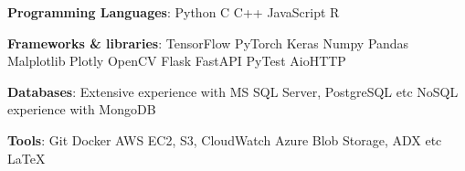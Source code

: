 \textbf{Programming Languages}: Python {\scalerel*{\cdot}{\bigodot}} C {\scalerel*{\cdot}{\bigodot}} C++ {\scalerel*{\cdot}{\bigodot}} JavaScript {\scalerel*{\cdot}{\bigodot}} R

\textbf{Frameworks \& libraries}: TensorFlow {\scalerel*{\cdot}{\bigodot}} PyTorch {\scalerel*{\cdot}{\bigodot}} Keras {\scalerel*{\cdot}{\bigodot}} Numpy {\scalerel*{\cdot}{\bigodot}} Pandas {\scalerel*{\cdot}{\bigodot}} Malplotlib {\scalerel*{\cdot}{\bigodot}} Plotly {\scalerel*{\cdot}{\bigodot}}
OpenCV {\scalerel*{\cdot}{\bigodot}} Flask {\scalerel*{\cdot}{\bigodot}} FastAPI {\scalerel*{\cdot}{\bigodot}} PyTest {\scalerel*{\cdot}{\bigodot}} AioHTTP


\textbf{Databases}: Extensive experience with MS SQL Server, PostgreSQL etc {\scalerel*{\cdot}{\bigodot}} NoSQL experience with MongoDB

\textbf{Tools}: Git {\scalerel*{\cdot}{\bigodot}} Docker {\scalerel*{\cdot}{\bigodot}} AWS EC2, S3, CloudWatch {\scalerel*{\cdot}{\bigodot}} Azure Blob Storage, ADX etc {\scalerel*{\cdot}{\bigodot}} \LaTeX{}

